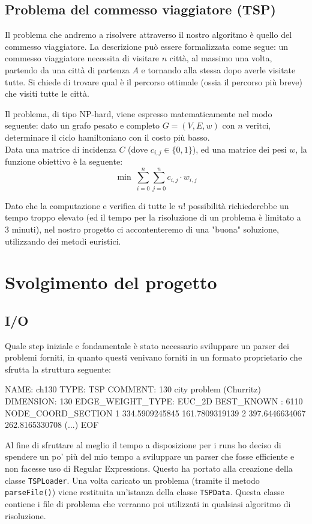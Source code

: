 \documentclass{article}
\newcommand{\ic}[1]{\texttt{#1}}
\begin{document}
\subsection{Problema del commesso viaggiatore (TSP)}
Il problema che andremo a risolvere attraverso il nostro
 algoritmo è quello del commesso viaggiatore.
La descrizione può essere formalizzata come segue:
un commesso viaggiatore necessita di visitare $n$ città, al
massimo una volta, partendo da una città di partenza $A$ e tornando
alla stessa dopo averle visitate tutte. Si chiede di trovare
qual è il percorso ottimale (ossia il percorso più breve)
che visiti tutte le città. 

Il problema, di tipo NP-hard, viene espresso matematicamente nel modo seguente:
dato un grafo pesato e completo $G = (V, E, w)$ con $n$ veritci, determinare il
ciclo hamiltoniano con il costo più basso. \\
Data una matrice di incidenza $C$ (dove $c_{i,j} \in \{0,1\}$),
ed una matrice dei pesi $w$,
la funzione obiettivo è la seguente:
\begin{equation}
    \min \ \sum_{i = 0}^n \sum_{j = 0}^n c_{i,j} \cdot w_{i,j}
\end{equation}

Dato che la computazione e verifica di tutte le $n!$ possibilità richiederebbe
un tempo troppo elevato (ed il tempo per la risoluzione di un 
problema è limitato a 3 minuti),
nel nostro progetto ci accontenteremo di una "buona" soluzione,
utilizzando dei metodi euristici.

\pagebreak
\section{Svolgimento del progetto}
\subsection{I/O}
Quale step iniziale e fondamentale è stato necessario sviluppare un parser dei problemi
forniti, in quanto questi venivano forniti in un formato proprietario che sfrutta la
struttura seguente:

\begin{tsp}
NAME: ch130
TYPE: TSP
COMMENT: 130 city problem (Churritz)
DIMENSION: 130
EDGE_WEIGHT_TYPE: EUC_2D
BEST_KNOWN : 6110
NODE_COORD_SECTION
1 334.5909245845 161.7809319139
2 397.6446634067 262.8165330708
(...)
EOF
\end{tsp}

Al fine di sfruttare al meglio il tempo a disposizione per i runs ho deciso di spendere
un po' più del mio tempo a sviluppare un parser che fosse efficiente e non facesse
uso di Regular Expressions. Questo ha portato alla creazione della classe \ic{TSPLoader}.
Una volta caricato un problema (tramite il metodo \ic{parseFile()}) viene restituita
un'istanza della classe \ic{TSPData}. Questa classe contiene i file di problema che
verranno poi utilizzati in qualsiasi algoritmo di risoluzione.
\end{document}
